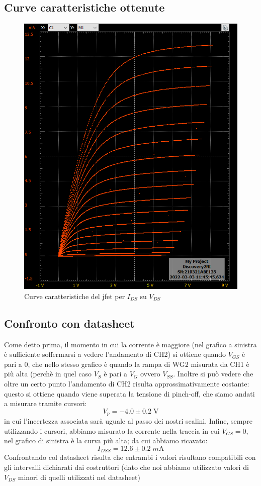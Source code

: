\documentclass[10pt, a4paper, italian]{article}
\begin{document}
\subsection{Curve caratteristiche ottenute}
\begin{figure}[htbp]
    \centering
	\includegraphics[scale=0.4]{vgs}
    \caption{Curve caratteristiche del jfet per $I_{DS}$ su $V_{DS}$}
\end{figure}

\subsection{Confronto con datasheet}
Come detto prima, il momento in cui la corrente è maggiore (nel grafico a sinistra è sufficiente soffermarsi a vedere l'andamento di CH2) si ottiene quando $V_{GS}$ è pari a 0, che nello stesso grafico è quando la rampa di WG2 misurata da CH1 è più alta (perchè in quel caso $V_S$ è pari a $V_G$ ovvero $V_{SS}$.
Inoltre si può vedere che oltre un certo punto l'andamento di CH2 risulta approssimativamente costante: questo si ottiene quando viene superata la tensione di pinch-off, che siamo andati a misurare tramite cursori:
\[
V_p = -4.0 \pm 0.2 \; \si{\V}
\]
in cui l'incertezza associata sarà uguale al passo dei nostri scalini.
Infine, sempre utilizzando i cursori, abbiamo misurato la corrente nella traccia in cui $V_{GS} = 0$, nel grafico di sinistra è la curva più alta; da cui abbiamo ricavato:
\[
I_{DSS} = 12.6 \pm 0.2 \; \si{m\A}
\]
Confrontando col datasheet risulta che entrambi i valori risultano compatibili con gli intervalli dichiarati dai costruttori (dato che noi abbiamo utilizzato valori di $V_{DS}$ minori di quelli utilizzati nel datasheet)
\end{document}

